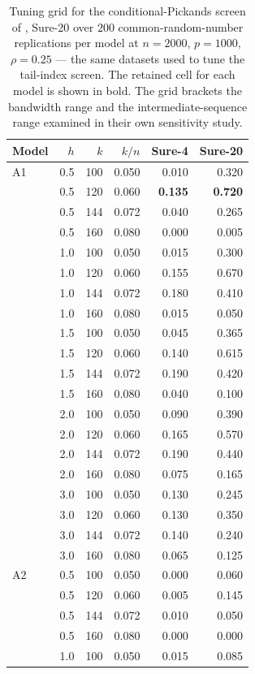 \begin{table}[t]
\centering
\caption{Tuning grid for the conditional-Pickands screen of \citet{yoshidaUmezu2026}, Sure-20 over $200$ common-random-number replications per model at $n=2000$, $p=1000$, $\rho=0.25$ --- the same datasets used to tune the tail-index screen. The retained cell for each model is shown in bold. The grid brackets the bandwidth range and the intermediate-sequence range examined in their own sensitivity study.}
\label{tab:yutuning}
\begin{tabular}{lrrrrr}
\toprule
Model & $h$ & $k$ & $k/n$ & Sure-4 & Sure-20\\
\midrule
A1 & 0.5 & 100 & 0.050 & 0.010 & 0.320\\
 & 0.5 & 120 & 0.060 & \textbf{0.135} & \textbf{0.720}\\
 & 0.5 & 144 & 0.072 & 0.040 & 0.265\\
 & 0.5 & 160 & 0.080 & 0.000 & 0.005\\
 & 1.0 & 100 & 0.050 & 0.015 & 0.300\\
 & 1.0 & 120 & 0.060 & 0.155 & 0.670\\
 & 1.0 & 144 & 0.072 & 0.180 & 0.410\\
 & 1.0 & 160 & 0.080 & 0.015 & 0.050\\
 & 1.5 & 100 & 0.050 & 0.045 & 0.365\\
 & 1.5 & 120 & 0.060 & 0.140 & 0.615\\
 & 1.5 & 144 & 0.072 & 0.190 & 0.420\\
 & 1.5 & 160 & 0.080 & 0.040 & 0.100\\
 & 2.0 & 100 & 0.050 & 0.090 & 0.390\\
 & 2.0 & 120 & 0.060 & 0.165 & 0.570\\
 & 2.0 & 144 & 0.072 & 0.190 & 0.440\\
 & 2.0 & 160 & 0.080 & 0.075 & 0.165\\
 & 3.0 & 100 & 0.050 & 0.130 & 0.245\\
 & 3.0 & 120 & 0.060 & 0.130 & 0.350\\
 & 3.0 & 144 & 0.072 & 0.140 & 0.240\\
 & 3.0 & 160 & 0.080 & 0.065 & 0.125\\
\addlinespace
A2 & 0.5 & 100 & 0.050 & 0.000 & 0.060\\
 & 0.5 & 120 & 0.060 & 0.005 & 0.145\\
 & 0.5 & 144 & 0.072 & 0.010 & 0.050\\
 & 0.5 & 160 & 0.080 & 0.000 & 0.000\\
 & 1.0 & 100 & 0.050 & 0.015 & 0.085\\

\end{tabular}
\end{table}
